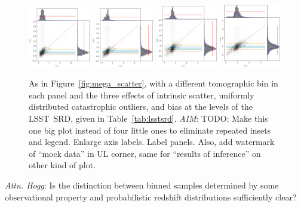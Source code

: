 \documentclass[iop]{emulateapj}
\newcommand{\todo}[3]{{\color{#2}\emph{#1}: #3}}
\newcommand{\aim}[1]{\todo{AIM}{red}{#1}}
\newcommand{\dwh}[1]{\todo{Attn. Hogg}{blue}{#1}}
\newcommand{\Fig}[1]{Figure~\ref{#1}}
\newcommand{\project}[1]{\textsc{#1}}
\newcommand{\lsst}{\project{LSST}}
\begin{document}
\begin{figure}
	\begin{center}
		\includegraphics[width=0.24\textwidth]{figures/chippr/0single_lsst_mega_scatter.png}
		\includegraphics[width=0.24\textwidth]{figures/chippr/1single_lsst_mega_scatter.png}
		\includegraphics[width=0.24\textwidth]{figures/chippr/2single_lsst_mega_scatter.png}
		\includegraphics[width=0.24\textwidth]{figures/chippr/3single_lsst_mega_scatter.png}
		\caption{As in \Fig{fig:mega_scatter}, with a different tomographic bin in each panel and the three effects of intrinsic scatter, uniformly distributed catastrophic outliers, and bias at the levels of the \lsst\ SRD, given in Table~\ref{tab:lsstsrd}.
		\aim{TODO: Make this one big plot instead of four little ones to eliminate repeated insets and legend.
		Enlarge axis labels.
		Label panels.
		Also, add watermark of ``mock data'' in UL corner, same for ``results of inference'' on other kind of plot.}
		}
		\label{fig:per-bin-scatter}
	\end{center}
\end{figure}

\dwh{Is the distinction between binned samples determined by some observational property and probabilistic redshift distributions sufficiently clear?}
\end{document}
